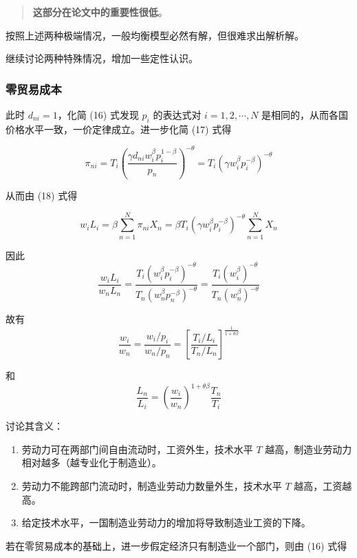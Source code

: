 \documentclass[
]{article}
\providecommand{\tightlist}{%
  \setlength{\itemsep}{0pt}\setlength{\parskip}{0pt}}
\begin{document}
\begin{quote}
\textbf{这部分在论文中的重要性很低}。
\end{quote}

按照上述两种极端情况，一般均衡模型必然有解，但很难求出解析解。

继续讨论两种特殊情况，增加一些定性认识。

\hypertarget{ux96f6ux8d38ux6613ux6210ux672c}{%
\subsubsection{零贸易成本}\label{ux96f6ux8d38ux6613ux6210ux672c}}

此时 \(d_{ni}=1\)，化简 (16) 式发现 \(p_i\) 的表达式对 \(i=1,2,\cdots,N\) 是相同的，从而各国价格水平一致，一价定律成立。进一步化简 (17) 式得

\[\pi_{n i}=T_{i}\left(\frac{\gamma d_{n i} w_{i}^{\beta} p_{i}^{1-\beta}}{p_{n}}\right)^{-\theta}=T_{i}\left(\gamma w_{i}^{\beta} p_{i}^{-\beta}\right)^{-\theta}\]

从而由 (18) 式得

\[
w_{i} L_{i}=\beta \sum_{n=1}^{N} \pi_{n i} X_{n}=\beta T_{i}\left(\gamma w_{i}^{\beta} p_{i}^{-\beta}\right)^{-\theta} \sum_{n=1}^{N} X_{n}
\]

因此 \[
\frac{w_{i} L_{i}}{w_{n} L_{n}}=\frac{T_{i}\left(w_{i}^{\beta} p_{i}^{-\beta}\right)^{-\theta}}{T_{n}\left(w_{n}^{\beta} p_{n}^{-\beta}\right)^{-\theta}}=\frac{T_{i}\left(w_{i}^{\beta}\right)^{-\theta}}{T_{n}\left(w_{n}^{\beta}\right)^{-\theta}}
\]

故有 \[
\frac{w_{i}}{w_{n}}=\frac{w_i/p_i}{w_n/p_n}=\left[\frac{T_{i} / L_{i}}{T_{n} / L_{n}}\right]^{\frac{1}{1+\theta \beta}} \tag{22}
\]

和
\[\frac{L_n}{L_i}=\left(\frac{w_i}{w_n}\right)^{1+\theta\beta}\frac{T_n}{T_i}\]

讨论其含义：

\begin{enumerate}
\def\labelenumi{\arabic{enumi}.}
\tightlist
\item
  劳动力可在两部门间自由流动时，工资外生，技术水平 \(T\) 越高，制造业劳动力相对越多（越专业化于制造业）。
\item
  劳动力不能跨部门流动时，制造业劳动力数量外生，技术水平 \(T\) 越高，工资越高。
\item
  给定技术水平，一国制造业劳动力的增加将导致制造业工资的下降。
\end{enumerate}

若在零贸易成本的基础上，进一步假定经济只有制造业一个部门，则由 (16) 式得
\end{document}
